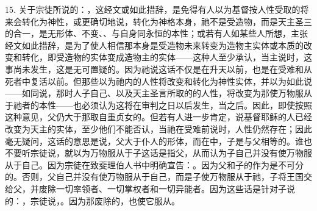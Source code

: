 15. 关于宗徒所说的：，这经文或如此措辞，是免得有人以为基督按人性受取的将来会转化为神性，或更确切地说，转化为神格本身，祂不是受造物，而是天主圣三的合一，是无形体、不变、、与自身同永恒的本性；或若有人如某些人所想，主张经文如此措辞，是为了使人相信那本身是受造物未来转变为造物主实体或本质的改变和转化，即受造物的实体变成造物主的实体——这种人至少承认，当主说时，这事尚未发生，这是无可置疑的。因为祂说这话不仅是在升天以前，也是在受难和从死者中复活以前。但那些以为祂内的人性将改变和转化为神性实体，并以为如此说——如同说，那时人子自己、以及天主圣言所取的的人性，将改变为那使万物服从于祂者的本性——也必须认为这将在审判之日以后发生，当之后。因此，即使按照这种意见，父仍大于那取自重贞女的。但若有人进一步肯定，说基督耶稣的人已经改变为天主的实体，至少他们不能否认，当祂在受难前说时，人性仍然存在；因此毫无疑问，这话的意思是说，父大于仆人的形体，而在中，子是与父相等的。谁也不要听宗徒说，就以为万物服从于子这话是指父，从而认为子自己并没有使万物服从于自己。因为宗徒在致斐理伯人书中明确宣告：。因为父和子的作为是不可分的。否则，父自己并没有使万物服从于自己，而是子使万物服从于祂，子将王国交给父，并废除一切率领者、一切掌权者和一切异能者。因为这些话是针对子说的：，宗徒说，。因为那废除的，也使它服从。\par

